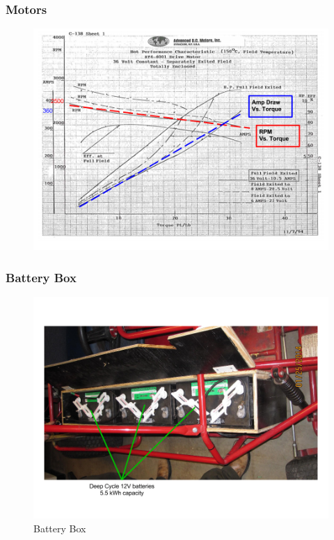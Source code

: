 \documentclass{beamer}
\begin{document}
\begin{frame}
	\frametitle{Motors}
	\begin{figure}
		\centering 
		\includegraphics[scale=.30]{figures/png/SeniorDesignPresentation-5.png} 
	\end{figure}	
\end{frame}
\begin{frame}
	\frametitle{Battery Box}
	\begin{figure}
		\centering 
		\includegraphics[scale=.3]{figures/png/SeniorDesignPresentation-6.png}
		\caption{Battery Box} 
	\end{figure}	
\end{frame}
\end{document}
